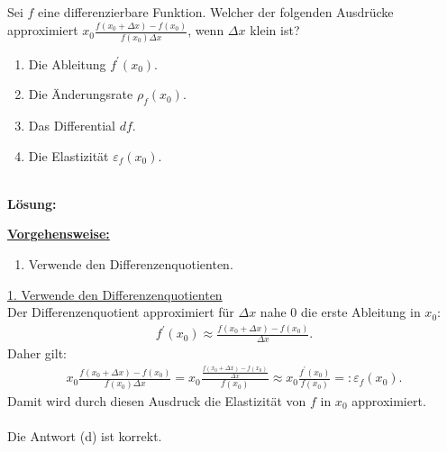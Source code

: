 \subsection*{}
Sei $f$ eine differenzierbare Funktion. Welcher der folgenden Ausdrücke approximiert 
$x_0 \frac{f(x_0 + \Delta x) - f(x_0)}{f(x_0) \Delta x}$, wenn $\Delta x$ klein ist?
\renewcommand{\labelenumi}{(\alph{enumi})}
\begin{enumerate}
	\item 
	Die Ableitung $f^\prime(x_0)$.
	\item
	Die Änderungsrate $\rho_f(x_0)$.	
	\item
	Das Differential $df$.
	\item
	Die Elastizität $\varepsilon_f(x_0)$.
\end{enumerate}
\ \\
\textbf{Lösung:}
\begin{mdframed}
	\underline{\textbf{Vorgehensweise:}}
	\renewcommand{\labelenumi}{\theenumi.}
	\begin{enumerate}
		\item Verwende den Differenzenquotienten.
	\end{enumerate}
\end{mdframed}

\underline{1. Verwende den Differenzenquotienten}\\
Der Differenzenquotient approximiert für $\Delta x $ nahe $0$ die erste Ableitung in $x_0$:
\begin{align*}
	f^\prime(x_0) \approx \frac{f(x_0 + \Delta x) - f(x_0)}{\Delta x}.
\end{align*}
Daher gilt:
\begin{align*}
	x_0 \frac{f(x_0 + \Delta x) - f(x_0)}{f(x_0) \Delta x}
	= 
	x_0 \frac{\frac{f(x_0 + \Delta x) - f(x_0)}{\Delta x}}{f(x_0) }
	\approx 
	x_0 \frac{f^\prime(x_0)}{f(x_0)}
	=: \varepsilon_f(x_0).
\end{align*}
Damit wird durch diesen Ausdruck die Elastizität von $f$ in $x_0$ approximiert.\\
\\
Die Antwort (d) ist korrekt.


\newpage
